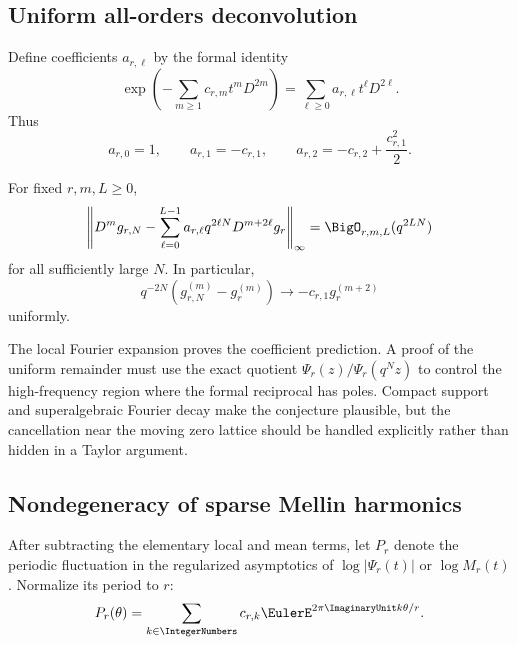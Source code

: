 \documentclass[11pt]{article}
\theoremstyle{definition}
\theoremstyle{remark}
\begin{document}
\subsection{Uniform all-orders deconvolution}

Define coefficients $a_{r,\ell}$ by the formal identity
\begin{equation}
 \exp\!\left(-\sum_{m\ge1}c_{r,m}t^mD^{2m}\right)
 =\sum_{\ell\ge0}a_{r,\ell}t^\ell D^{2\ell}.              \label{p5:eq:ar-ell-def}
\end{equation}
Thus
\begin{equation}
 a_{r,0}=1,
 \qquad a_{r,1}=-c_{r,1},
 \qquad a_{r,2}=-c_{r,2}+\frac{c_{r,1}^2}{2}.             \label{p5:eq:first-ar-ell}
\end{equation}

\begin{conjecture}
\label{p5:conj:strong-tail}
For fixed $r,m,L\ge0$,
\begin{equation}
 \left\|D^m g_{r,N}-
   \sum_{\ell=0}^{L-1}a_{r,\ell}q^{2\ell N}
      D^{m+2\ell}g_r\right\|_{\infty}
 =\BigO_{r,m,L}(q^{2LN})                                  \label{p5:eq:strong-tail-conj}
\end{equation}
for all sufficiently large $N$.
In particular,
\begin{equation}
 q^{-2N}(g_{r,N}^{(m)}-g_r^{(m)})
 \longrightarrow-c_{r,1}g_r^{(m+2)}                       \label{p5:eq:first-tail-limit}
\end{equation}
uniformly.
\end{conjecture}

The local Fourier expansion proves the coefficient prediction.  A proof of the
uniform remainder must use the exact quotient
$\Psi_r(z)/\Psi_r(q^Nz)$ to control the high-frequency region where the formal
reciprocal has poles.  Compact support and superalgebraic Fourier decay make the
conjecture plausible, but the cancellation near the moving zero lattice should
be handled explicitly rather than hidden in a Taylor argument.

\subsection{Nondegeneracy of sparse Mellin harmonics}

After subtracting the elementary local and mean terms, let $P_r$ denote the
periodic fluctuation in the regularized asymptotics of $\log|\Psi_r(t)|$ or
$\log M_r(t)$.  Normalize its period to $r$:
\begin{equation}
 P_r(\theta)=\sum_{k\in\IntegerNumbers}c_{r,k}\EulerE^{2\pi\ImaginaryUnit k\theta/r}.  \label{p5:eq:Pr-conj-Fourier}
\end{equation}
\end{document}
